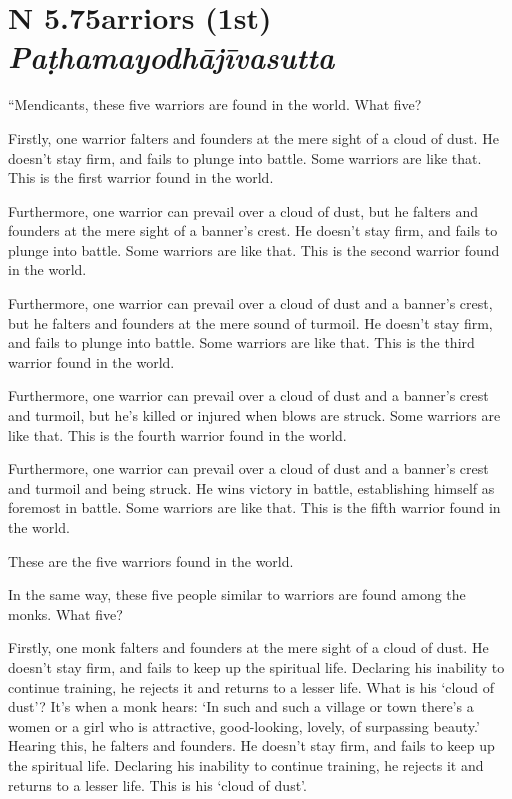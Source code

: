 \documentclass[12pt,openany]{book}%
\newcommand*{\suttatitleacronym}[1]{\smaller[2]{#1}\vspace*{.3em}}
\newcommand*{\suttatitletranslation}[1]{\linebreak{#1}}
\newcommand*{\suttatitleroot}[1]{\linebreak\smaller[2]\itshape{#1}}
\newcommand*{\tocacronym}[1]{\hspace*{-3.3em}{#1}\quad}
\newcommand*{\toctranslation}[1]{#1}
\newcommand*{\tocroot}[1]{(\textit{#1})}
\begin{document}
%
\section*{{\suttatitleacronym AN 5.75}{\suttatitletranslation Warriors (1st) }{\suttatitleroot Paṭhamayodhājīvasutta}}
\addcontentsline{toc}{section}{\tocacronym{AN 5.75} \toctranslation{Warriors (1st) } \tocroot{Paṭhamayodhājīvasutta}}

“Mendicants, these five warriors are found in the world. What five? 

Firstly, one warrior falters and founders at the mere sight of a cloud of dust. He doesn’t stay firm, and fails to plunge into battle. Some warriors are like that. This is the first warrior found in the world. 

Furthermore, one warrior can prevail over a cloud of dust, but he falters and founders at the mere sight of a banner’s crest. He doesn’t stay firm, and fails to plunge into battle. Some warriors are like that. This is the second warrior found in the world. 

Furthermore, one warrior can prevail over a cloud of dust and a banner’s crest, but he falters and founders at the mere sound of turmoil. He doesn’t stay firm, and fails to plunge into battle. Some warriors are like that. This is the third warrior found in the world. 

Furthermore, one warrior can prevail over a cloud of dust and a banner’s crest and turmoil, but he’s killed or injured when blows are struck. Some warriors are like that. This is the fourth warrior found in the world. 

Furthermore, one warrior can prevail over a cloud of dust and a banner’s crest and turmoil and being struck. He wins victory in battle, establishing himself as foremost in battle. Some warriors are like that. This is the fifth warrior found in the world. 

These are the five warriors found in the world. 

In the same way, these five people similar to warriors are found among the monks. What five? 

Firstly, one monk falters and founders at the mere sight of a cloud of dust. He doesn’t stay firm, and fails to keep up the spiritual life. Declaring his inability to continue training, he rejects it and returns to a lesser life. What is his ‘cloud of dust’? It’s when a monk hears: ‘In such and such a village or town there’s a women or a girl who is attractive, good-looking, lovely, of surpassing beauty.’ Hearing this, he falters and founders. He doesn’t stay firm, and fails to keep up the spiritual life. Declaring his inability to continue training, he rejects it and returns to a lesser life. This is his ‘cloud of dust’. 
\end{document}
